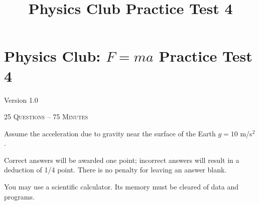 \documentclass[12pt,letterpaper]{article}
\title{Physics Club Practice Test 4}
\begin{document}
\section*{Physics Club: $F=ma$ Practice Test 4}\hfill Version 1.0
\vspace{-2.5pt}
\begin{center}
\textsc{25 Questions -- 75 Minutes}
\end{center}
\vspace{-5pt}
Assume the acceleration due to gravity near the surface of the Earth $g = 10$ m/s$^2$.
\smallskip

Correct answers will be awarded one point; incorrect answers will result in a deduction of 1/4 point. There is no penalty for leaving an answer blank.
\smallskip

You may use a scientific calculator. Its memory must be cleared of data and programs.
\vspace{-7.5pt}
\end{document}
